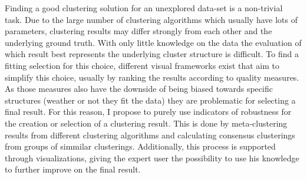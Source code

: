 \iffalse  \fi

Finding a good clustering solution for an unexplored data-set is a non-trivial task. Due to the large number of clustering algorithms which usually have lots of parameters, clustering results may differ strongly from each other and the underlying ground truth. With only little knowledge on the data the evaluation of which result best represents the underlying cluster structure is difficult. To find a fitting selection for this choice, different visual frameworks exist that aim to simplify this choice, usually by ranking the results according to quality measures. As those measures also have the downside of being biased towards specific structures (weather or not they fit the data) they are problematic for selecting a final result. For this reason, I propose to purely use indicators of robustness for the creation or selection of a clustering result. This is done by meta-clustering results from different clustering algorithms and calculating consensus clusterings from groups of simmilar clusterings. Additionally, this process is supported through visualizations, giving the expert user the possibility to use his knowledge to further improve on the final result.
